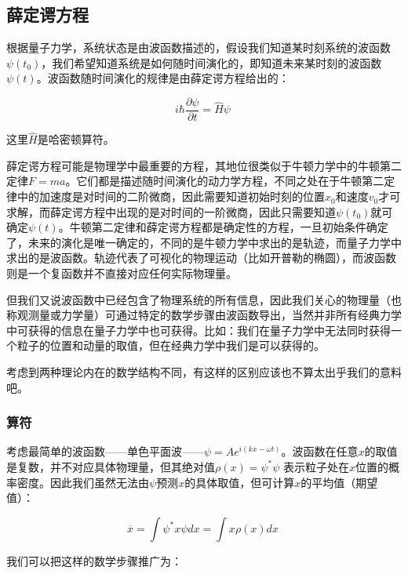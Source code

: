 \subsection{薛定谔方程}

根据量子力学，系统状态是由波函数描述的，假设我们知道某时刻系统的波函数$\psi(t_0)$，我们希望知道系统是如何随时间演化的，即知道未来某时刻的波函数$\psi(t)$。波函数随时间演化的规律是由薛定谔方程给出的：

\begin{equation}
i \hbar \frac{\partial \psi}{\partial t} = \hat H \psi~
\end{equation}

这里$\hat H$是哈密顿算符。

薛定谔方程可能是物理学中最重要的方程，其地位很类似于牛顿力学中的牛顿第二定律$F=ma$。它们都是描述随时间演化的动力学方程，不同之处在于牛顿第二定律中的加速度是对时间的二阶微商，因此需要知道初始时刻的位置$x_0$和速度$v_0$才可求解，而薛定谔方程中出现的是对时间的一阶微商，因此只需要知道$\psi(t_0)$就可确定$\psi(t)$。牛顿第二定律和薛定谔方程都是确定性的方程，一旦初始条件确定了，未来的演化是唯一确定的，不同的是牛顿力学中求出的是轨迹，而量子力学中求出的是波函数。轨迹代表了可视化的物理运动（比如开普勒的椭圆），而波函数则是一个复函数并不直接对应任何实际物理量。

但我们又说波函数中已经包含了物理系统的所有信息，因此我们关心的物理量（也称观测量或力学量）可通过特定的数学步骤由波函数导出，当然并非所有经典力学中可获得的信息在量子力学中也可获得。比如：我们在量子力学中无法同时获得一个粒子的位置和动量的取值，但在经典力学中我们是可以获得的。

考虑到两种理论内在的数学结构不同，有这样的区别应该也不算太出乎我们的意料吧。


\subsubsection{算符}

考虑最简单的波函数——单色平面波——$\psi = A e^{i(kx - \omega t)}$。波函数在任意$x$的取值是复数，并不对应具体物理量，但其绝对值$\rho(x) = \psi^* \psi $ 表示粒子处在$x$位置的概率密度。因此我们虽然无法由$\psi$预测$x$的具体取值，但可计算$x$的平均值（期望值）：

\begin{equation}
\overline{x} = \int \psi^* x \psi dx = \int x \rho(x) dx~
\end{equation}

我们可以把这样的数学步骤推广为：

